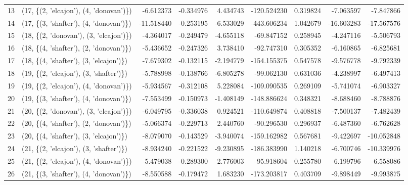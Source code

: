 \begin{tabular}{llrrrrrrr}
13 &  (17, \{(2, 'elcajon'), (4, 'donovan')\}) &  -6.612373 & -0.334976 &   4.434743 & -120.524230 &  0.319824 &  -7.063597 &  -7.847866 \\
14 &  (17, \{(3, 'shafter'), (4, 'donovan')\}) & -11.518440 & -0.253195 &  -6.533029 & -443.606234 &  1.042679 & -16.603283 & -17.567576 \\
15 &  (18, \{(2, 'donovan'), (3, 'elcajon')\}) &  -4.364017 & -0.249479 &  -4.655118 &  -69.847152 &  0.258945 &  -4.247116 &  -5.506793 \\
16 &  (18, \{(4, 'shafter'), (2, 'donovan')\}) &  -5.436652 & -0.247326 &   3.738410 &  -92.747310 &  0.305352 &  -6.160865 &  -6.825681 \\
17 &  (18, \{(4, 'shafter'), (3, 'elcajon')\}) &  -7.679302 & -0.132115 &  -2.194779 & -154.155375 &  0.547578 &  -9.576778 &  -9.792339 \\
18 &  (19, \{(2, 'elcajon'), (3, 'shafter')\}) &  -5.788998 & -0.138766 &  -6.805278 &  -99.062130 &  0.631036 &  -4.238997 &  -6.497413 \\
19 &  (19, \{(2, 'elcajon'), (4, 'donovan')\}) &  -5.934567 & -0.312108 &   5.228084 & -109.090535 &  0.269109 &  -5.741074 &  -6.903327 \\
20 &  (19, \{(3, 'shafter'), (4, 'donovan')\}) &  -7.553499 & -0.150973 &  -1.408149 & -148.886624 &  0.348321 &  -8.688460 &  -8.788876 \\
21 &  (20, \{(2, 'donovan'), (3, 'elcajon')\}) &  -6.049795 & -0.336038 &   0.924521 & -110.649874 &  0.408818 &  -7.500137 &  -7.482439 \\
22 &  (20, \{(4, 'shafter'), (2, 'donovan')\}) &  -5.066374 & -0.229713 &   2.440760 &  -90.296530 &  0.296937 &  -6.487360 &  -6.762628 \\
23 &  (20, \{(4, 'shafter'), (3, 'elcajon')\}) &  -8.079070 & -0.143529 &  -3.940074 & -159.162982 &  0.567681 &  -9.422697 & -10.052848 \\
24 &  (21, \{(2, 'elcajon'), (3, 'shafter')\}) &  -8.934240 & -0.221522 &  -9.230895 & -186.383990 &  1.140218 &  -6.700746 & -10.339976 \\
25 &  (21, \{(2, 'elcajon'), (4, 'donovan')\}) &  -5.479038 & -0.289300 &   2.776003 &  -95.918604 &  0.255780 &  -6.199796 &  -6.558086 \\
26 &  (21, \{(3, 'shafter'), (4, 'donovan')\}) &  -8.550588 & -0.179472 &   1.683230 & -173.203817 &  0.403709 &  -9.898449 &  -9.993875 \\
\bottomrule
\end{tabular}
